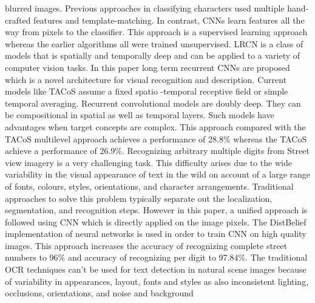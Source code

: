 \documentclass[12pt]{article}
\begin{document}
blurred images. Previous approaches in classifying
characters used multiple hand-crafted features  and
template-matching. In contrast, CNNs learn features all
the way from pixels to the classifier. This approach is a
supervised learning approach whereas the earlier algorithms
all were trained unsupervised.
LRCN  is a class of models that is spatially and
temporally deep and can be applied to a variety of computer
vision tasks. In this paper long term recurrent CNNs are
proposed which is a novel architecture for visual
recognition and description. Current models like TACoS
assume a fixed spatio -temporal receptive field or simple
temporal averaging. Recurrent convolutional models are
doubly deep. They can be compositional in spatial as well
as temporal layers. Such models have advantages when
target concepts are complex. This approach compared with
the TACoS  multilevel approach achieves a
performance of 28.8\% whereas the TACoS achieve a
performance of 26.9\%. Recognizing arbitrary multiple
digits from Street view imagery is a very challenging task.
This difficulty arises due to the wide variability in the
visual appearance of text in the wild on account of a large
range of fonts, colours, styles, orientations, and character
arrangements. Traditional approaches to solve this
problem typically separate out the localization,
segmentation, and recognition steps. However in this paper,
a unified approach is followed using CNN which is directly
applied on the image pixels. The DistBelief
implementation of neural networks is used in order to train
CNN on high quality images. This approach increases the
accuracy of recognizing complete street numbers to 96\%
and accuracy of recognizing per digit to 97.84\%.
The traditional OCR techniques can’t be used for text
detection in natural scene images because of variability in
appearances, layout, fonts and styles as also inconsistent
lighting, occlusions, orientations, and noise and background
\end{document}
